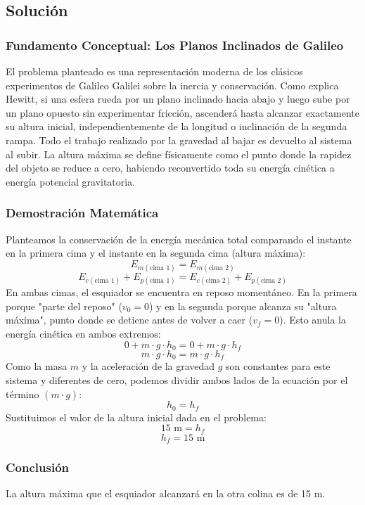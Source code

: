 \documentclass[12pt,a4paper]{article}
\begin{document}
\subsection*{Solución}

\subsubsection*{Fundamento Conceptual: Los Planos Inclinados de Galileo}
El problema planteado es una representación moderna de los clásicos experimentos de Galileo Galilei sobre la inercia y conservación. Como explica Hewitt, si una esfera rueda por un plano inclinado hacia abajo y luego sube por un plano opuesto sin experimentar fricción, ascenderá hasta alcanzar exactamente su altura inicial, independientemente de la longitud o inclinación de la segunda rampa. Todo el trabajo realizado por la gravedad al bajar es devuelto al sistema al subir. La altura máxima se define físicamente como el punto donde la rapidez del objeto se reduce a cero, habiendo reconvertido toda su energía cinética a energía potencial gravitatoria.

\subsubsection*{Demostración Matemática}
Planteamos la conservación de la energía mecánica total comparando el instante en la primera cima y el instante en la segunda cima (altura máxima):
$$E_{m(\text{cima 1})} = E_{m(\text{cima 2})}$$
$$E_{c(\text{cima 1})} + E_{p(\text{cima 1})} = E_{c(\text{cima 2})} + E_{p(\text{cima 2})}$$
En ambas cimas, el esquiador se encuentra en reposo momentáneo. En la primera porque "parte del reposo" ($v_0 = 0$) y en la segunda porque alcanza su "altura máxima", punto donde se detiene antes de volver a caer ($v_f = 0$). Esto anula la energía cinética en ambos extremos:
$$0 + m \cdot g \cdot h_0 = 0 + m \cdot g \cdot h_f$$
$$m \cdot g \cdot h_0 = m \cdot g \cdot h_f$$
Como la masa $m$ y la aceleración de la gravedad $g$ son constantes para este sistema y diferentes de cero, podemos dividir ambos lados de la ecuación por el término $(m \cdot g)$:
$$h_0 = h_f$$
Sustituimos el valor de la altura inicial dada en el problema:
$$15 \text{ m} = h_f$$
$$h_f = 15 \text{ m}$$

\subsubsection*{Conclusión}
La altura máxima que el esquiador alcanzará en la otra colina es de 15 m.
\end{document}
